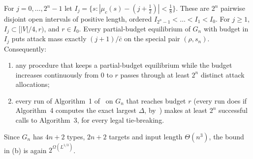 \begin{theorem}\label{artlck:thm:gn}
\statusrefereed
For $j=0,\dots,2^n-1$ let $I_j=\{s:|\mu_c(s)-(j+\frac12)|<\frac18\}$. These are $2^n$ pairwise disjoint
open intervals of positive length, ordered $I_{2^n-1}<\dots<I_1<I_0$. For $j\ge1$, $I_j\subset[|V|/4,r)$,
and $r\in I_0$. Every partial-budget equilibrium of $G_n$ with budget in $I_j$ puts attack mass exactly
$(j+1)/\bar c$ on the special pair $(\rho,s_n)$. Consequently:
\begin{enumerate}[label=(\alph*),nosep]
\item any procedure that keeps a partial-budget equilibrium while the budget increases continuously from
$0$ to $r$ passes through at least $2^n$ distinct attack allocations;
\item every run of Algorithm~1 of~\cite{lck16} on $G_n$ that reaches budget $r$ (every run does if Algorithm~4 computes the exact largest $\Delta$, by~\cite[Theorem~5]{lck16}) makes at least $2^n$ successful calls to Algorithm~3, for
every legal tie-breaking.
\end{enumerate}
Since $G_n$ has $4n+2$ types, $2n+2$ targets and input length $\Theta(n^3)$, the bound in (b) is again
$2^{\Omega(L^{1/3})}$.
\end{theorem}

